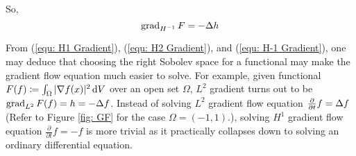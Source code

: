 \documentclass[../dissertation.tex]{subfiles}
\begin{document}
So,
\begin{equation}
    \operatorname{grad}_{H^{-1}} F = -\Delta h
    \label{equ: H-1 Gradient}
\end{equation}
\begin{remark}
    From (\ref{equ: H1 Gradient}), (\ref{equ: H2 Gradient}), and (\ref{equ: H-1 Gradient}), one may deduce that
    choosing the right Sobolev space for a functional may make the gradient flow equation much easier to solve.
    For example, given functional $F (f) \coloneqq \int_{\Omega} |\nabla f (x)|^2 \, \text{d} V$ over an open set $\Omega$,
    $L^2$ gradient turns out to be $\operatorname{grad}_{L^2} F (f) = h = -\Delta f$. 
    Instead of solving $L^2$ gradient flow equation $\frac{\partial}{\partial t} f = \Delta f$ (Refer to Figure \ref{fig: GF} for the case $\Omega = (-1, 1)$.),
    solving $H^1$ gradient flow equation $\frac{\partial}{\partial t}f = -f$ is more trivial
    as it practically collapses down to solving an ordinary differential equation.
\end{remark}
\end{document}
